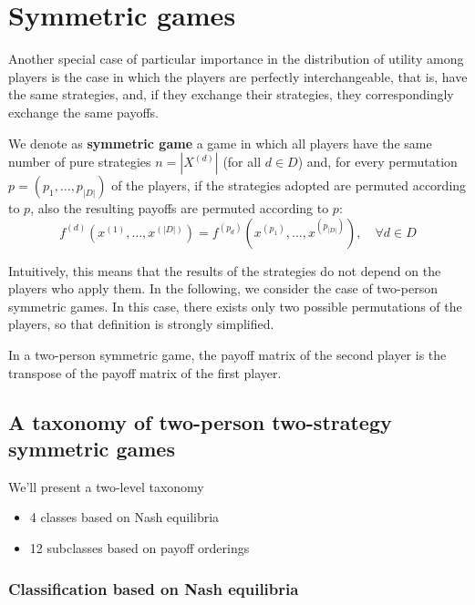 \chapter{Symmetric games}
\label{ch:sg}

Another special case of particular importance in the distribution of utility among players is the case in which the players are perfectly interchangeable, that is, have the same strategies, and, if they exchange their strategies, they correspondingly exchange the same payoffs. \\

\begin{definition}
	We denote as \textbf{symmetric game} a game in which all players have the same number of pure strategies $n = |X^{(d)}|$ (for all $d \in D$) and, for every permutation $p = (p_1, \dots, p_{|D|})$ of the players, if the strategies adopted are permuted according to $p$, also the resulting payoffs are permuted according to $p$: 
	$$ f^{(d)} \left(x^{(1)}, \dots, x^{(|D|)}\right) = f^{(p_d)} \left(x^{(p_1)}, \dots, x^{(p_{|D|})}\right), \quad \forall d \in D $$
\end{definition}

Intuitively, this means that the results of the strategies do not depend on the players who apply them. In the following, we consider the case of two-person symmetric games. In this case, there exists only two possible permutations of the players, so that definition is strongly simplified.

In a two-person symmetric game, the payoff matrix of the second player is the transpose of the payoff matrix of the first player.

\section{A taxonomy of two-person two-strategy symmetric games}
\label{sec:taxonomy}

We'll present a two-level taxonomy
\begin{itemize}
	\item 4 classes based on Nash equilibria
	
	\item 12 subclasses based on payoff orderings
\end{itemize}

\subsection{Classification based on Nash equilibria}

